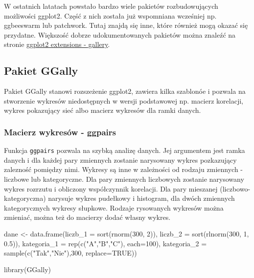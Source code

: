 \documentclass[
]{book}
\newenvironment{Shaded}{\begin{snugshade}}{\end{snugshade}}
\newcommand{\AttributeTok}[1]{\textcolor[rgb]{0.77,0.63,0.00}{#1}}
\newcommand{\ConstantTok}[1]{\textcolor[rgb]{0.00,0.00,0.00}{#1}}
\newcommand{\DecValTok}[1]{\textcolor[rgb]{0.00,0.00,0.81}{#1}}
\newcommand{\FloatTok}[1]{\textcolor[rgb]{0.00,0.00,0.81}{#1}}
\newcommand{\FunctionTok}[1]{\textcolor[rgb]{0.00,0.00,0.00}{#1}}
\newcommand{\NormalTok}[1]{#1}
\newcommand{\OtherTok}[1]{\textcolor[rgb]{0.56,0.35,0.01}{#1}}
\newcommand{\StringTok}[1]{\textcolor[rgb]{0.31,0.60,0.02}{#1}}
\begin{document}
W ostatnich latatach powstało bardzo wiele pakietów rozbudowujących możliwości ggplot2. Część z nich została już wspomniana wcześniej np. ggbeeswarm lub patchwork. Tutaj znajdą się inne, które również mogą okazać się przydatne. Większość dobrze udokumentowanych pakietów można znaleźć na stronie \href{https://exts.ggplot2.tidyverse.org/gallery/}{ggplot2 extensions - gallery}.

\hypertarget{pakiet-ggally}{%
\subsection{Pakiet GGally}\label{pakiet-ggally}}

Pakiet GGally stanowi rozszeżenie ggplot2, zawiera kilka szablonóe i pozwala na stworzenie wykresów niedostępnych w wersji podstawowej np. macierz korelacji, wykres pokazujący sieć albo macierz wykresów dla ramki danych.

\hypertarget{macierz-wykresuxf3w---ggpairs}{%
\subsubsection{Macierz wykresów - ggpairs}\label{macierz-wykresuxf3w---ggpairs}}

Funkcja \texttt{ggpairs} pozwala na szybką analizę danych. Jej argumentem jest ramka danych i dla każdej pary zmiennych zostanie narysowany wykres pozkazujący zalezność pomiędzy nimi. Wykresy są inne w zależności od rodzaju zmiennych - liczbowe lub kategoryczne. Dla pary zmiennych liczbowych zostanie narysowany wykres rozrzutu i obliczony współczynnik korelacji. Dla pary mieszanej (liczbowo-kategoryczna) narysuje wykres pudełkowy i histogram, dla dwóch zmiennych kategorycznych wykresy słupkowe. Rodzaje rysowanych wykresów można zmieniać, można też do macierzy dodać własny wykres.

\begin{Shaded}
\begin{Highlighting}[]
\NormalTok{dane }\OtherTok{\textless{}{-}} \FunctionTok{data.frame}\NormalTok{(}\AttributeTok{liczb\_1 =} \FunctionTok{sort}\NormalTok{(}\FunctionTok{rnorm}\NormalTok{(}\DecValTok{300}\NormalTok{, }\DecValTok{2}\NormalTok{)), }\AttributeTok{liczb\_2 =} \FunctionTok{sort}\NormalTok{(}\FunctionTok{rlnorm}\NormalTok{(}\DecValTok{300}\NormalTok{, }\DecValTok{1}\NormalTok{, }\FloatTok{0.5}\NormalTok{)),}
                   \AttributeTok{kategoria\_1 =} \FunctionTok{rep}\NormalTok{(}\FunctionTok{c}\NormalTok{(}\StringTok{"A"}\NormalTok{,}\StringTok{"B"}\NormalTok{,}\StringTok{"C"}\NormalTok{), }\AttributeTok{each=}\DecValTok{100}\NormalTok{), }
                   \AttributeTok{kategoria\_2 =} \FunctionTok{sample}\NormalTok{(}\FunctionTok{c}\NormalTok{(}\StringTok{"Tak"}\NormalTok{,}\StringTok{"Nie"}\NormalTok{),}\DecValTok{300}\NormalTok{, }\AttributeTok{replace=}\ConstantTok{TRUE}\NormalTok{))}

\FunctionTok{library}\NormalTok{(GGally)}
\end{Highlighting}
\end{Shaded}
\end{document}
